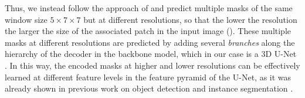 Thus, we instead follow the approach of \cite{Gao_2019_ICCV} and predict multiple \maskname masks of the same window size $5\times 7 \times 7$ but at different resolutions, so that the lower the resolution the larger the size of the associated patch in the input image  (). 
These multiple masks at different resolutions are predicted by adding several \emph{\encBr branches} along the hierarchy of the decoder in the backbone model, which in our case is a 3D U-Net \cite{ronneberger2015u,cciccek20163d}. 
In this way, the encoded \maskname masks at higher and lower resolutions can be effectively learned at different feature levels in the feature pyramid of the U-Net, as it was already shown in previous work on object detection and instance segmentation \cite{Gao_2019_ICCV,lin2017feature}.



